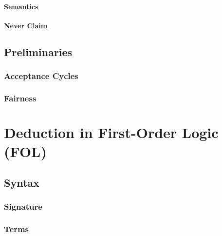 \documentclass[a4paper, 11pt, accentcolor = tud3b]{tudreport}
\begin{document}
                \subsubsection{Semantics} %

                \subsubsection{Never Claim} %

        \section{Preliminaries} %

            \subsection{Acceptance Cycles} %

            \subsection{Fairness} %

    \chapter{Deduction in First-Order Logic (FOL)} %

        \section{Syntax} %

            \subsection{Signature} %

            \subsection{Terms} %
\end{document}
